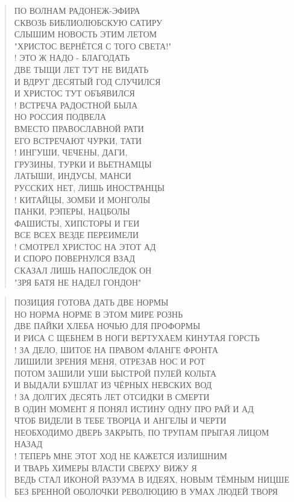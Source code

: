 \poemtitle{***}
\begin{verse}
ПО ВОЛНАМ РАДОНЕЖ-ЭФИРА \\
СКВОЗЬ БИБЛИОЛЮБСКУЮ САТИРУ\\
СЛЫШИМ НОВОСТЬ ЭТИМ ЛЕТОМ\\
"ХРИСТОС ВЕРНЁТСЯ С ТОГО СВЕТА!"\\!
ЭТО Ж НАДО - БЛАГОДАТЬ\\
ДВЕ ТЫЩИ ЛЕТ ТУТ НЕ ВИДАТЬ\\
И ВДРУГ ДЕСЯТЫЙ ГОД СЛУЧИЛСЯ\\
И ХРИСТОС ТУТ ОБЪЯВИЛСЯ\\!
ВСТРЕЧА РАДОСТНОЙ БЫЛА\\
НО РОССИЯ ПОДВЕЛА\\
ВМЕСТО ПРАВОСЛАВНОЙ РАТИ\\
ЕГО ВСТРЕЧАЮТ ЧУРКИ, ТАТИ\\!
ИНГУШИ, ЧЕЧЕНЫ, ДАГИ,\\
ГРУЗИНЫ, ТУРКИ И ВЬЕТНАМЦЫ\\
ЛАТЫШИ, ИНДУСЫ, МАНСИ\\
РУССКИХ НЕТ, ЛИШЬ ИНОСТРАНЦЫ\\!
КИТАЙЦЫ, ЗОМБИ И МОНГОЛЫ\\
ПАНКИ, РЭПЕРЫ, НАЦБОЛЫ\\
ФАШИСТЫ, ХИПСТОРЫ И ГЕИ\\
ВСЕ ВСЕХ ВЕЗДЕ ПЕРЕИМЕЛИ\\!
СМОТРЕЛ ХРИСТОС НА ЭТОТ АД\\
И СПОРО ПОВЕРНУЛСЯ ВЗАД\\
СКАЗАЛ ЛИШЬ НАПОСЛЕДОК ОН\\
"ЗРЯ БАТЯ НЕ НАДЕЛ ГОНДОН"
\end{verse}

\poemtitle{***}
\begin{verse}
ПОЗИЦИЯ ГОТОВА ДАТЬ ДВЕ НОРМЫ \\
НО НОРМА НОРМЕ В ЭТОМ МИРЕ РОЗНЬ\\
ДВЕ ПАЙКИ ХЛЕБА НОЧЬЮ ДЛЯ ПРОФОРМЫ\\
И РИСА С ЩЕБНЕМ В НОГИ ВЕРТУХАЕМ КИНУТАЯ ГОРСТЬ\\!
ЗА ДЕЛО, ШИТОЕ НА ПРАВОМ ФЛАНГЕ ФРОНТА\\
ЛИШИЛИ ЗРЕНИЯ МЕНЯ, ОТРЕЗАВ НОС И РОТ\\
ПОТОМ ЗАШИЛИ УШИ БЫСТРОЙ ПУЛЕЙ КОЛЬТА\\
И ВЫДАЛИ БУШЛАТ ИЗ ЧЁРНЫХ НЕВСКИХ ВОД\\!
ЗА ДОЛГИХ ДЕСЯТЬ ЛЕТ ОТСИДКИ В СМЕРТИ\\
В ОДИН МОМЕНТ Я ПОНЯЛ ИСТИНУ ОДНУ ПРО РАЙ И АД\\
ЧТОБ ВИДЕЛИ В ТЕБЕ ТВОРЦА И АНГЕЛЫ И ЧЕРТИ\\
НЕОБХОДИМО ДВЕРЬ ЗАКРЫТЬ, ПО ТРУПАМ ПРЫГАЯ ЛИЦОМ НАЗАД\\!
ТЕПЕРЬ МНЕ ЭТОТ ХОД НЕ КАЖЕТСЯ ИЗЛИШНИМ\\
И ТВАРЬ ХИМЕРЫ ВЛАСТИ СВЕРХУ ВИЖУ Я\\
ВЕДЬ СТАЛ ИКОНОЙ РАЗУМА В ИДЕЯХ, НОВЫМ ТЁМНЫМ НИЦШЕ\\
БЕЗ БРЕННОЙ ОБОЛОЧКИ РЕВОЛЮЦИЮ В УМАХ ЛЮДЕЙ ТВОРЯ
\end{verse}

